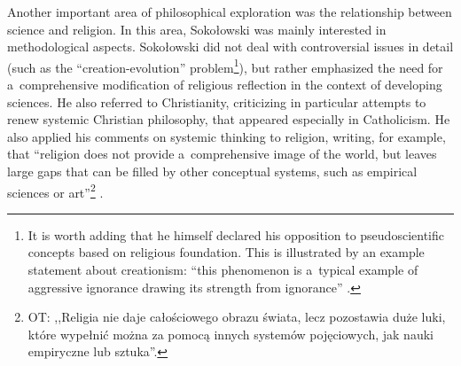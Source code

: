 \documentclass[%
  manuscript=article,
  year=2024,
  volume=77,
  doi=00000.000,
]{zfn}
\begin{document}
Another important area of philosophical exploration was the relationship between science and religion. In this area, Sokołowski was mainly interested in methodological aspects. Sokołowski did not deal with controversial issues in detail (such as the ``creation-evolution'' problem\footnote{It is worth adding that he himself declared his opposition to pseudoscientific concepts based on religious foundation. This is illustrated by an example statement about creationism: ``this phenomenon is a~typical example of aggressive ignorance drawing its strength from ignorance'' 
\parencite[][pp.259–260]{}.%
}), but rather emphasized the need for a~comprehensive modification of religious reflection in the context of developing sciences. He also referred to Christianity, criticizing in particular attempts to renew systemic Christian philosophy, that appeared especially in Catholicism. He also applied his comments on systemic thinking to religion, writing, for example, that ``religion does not provide a~comprehensive image of the world, but leaves large gaps that can be filled by other conceptual systems, such as empirical sciences or art''\footnote{OT: ,,Religia nie daje całościowego obrazu świata, lecz pozostawia duże luki, które wypełnić można za pomocą innych systemów pojęciowych, jak nauki empiryczne lub sztuka''.} 
\parencite[][p.199]{}.%
\end{document}
